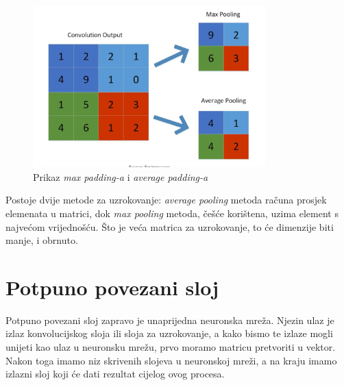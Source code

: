 \FloatBarrier
\begin{figure}[h]
    \centering
    \includegraphics[width=0.8\textwidth]{images/Pooling}
    \caption{Prikaz \emph{max padding-a} i \emph{average padding-a} }
    \label{fig:slika16}
\end{figure}
\FloatBarrier

Postoje dvije metode za uzrokovanje: \emph{average pooling} metoda računa prosjek elemenata u matrici, dok \emph{max pooling} metoda, češće korištena, uzima element s najvećom vrijednošću.
Što je veća matrica za uzrokovanje, to će dimenzije biti manje, i obrnuto.

\section{Potpuno povezani sloj}\label{sec:potpuno-povezani-sloj}
Potpuno povezani sloj zapravo je unaprijedna neuronska mreža.
Njezin ulaz je izlaz konvolucijskog sloja ili sloja za uzrokovanje, a kako bismo te izlaze mogli unijeti kao ulaz u neuronsku mrežu, prvo moramo matricu pretvoriti u vektor.
Nakon toga imamo niz skrivenih slojeva u neuronskoj mreži, a na kraju imamo izlazni sloj koji će dati rezultat cijelog ovog procesa.